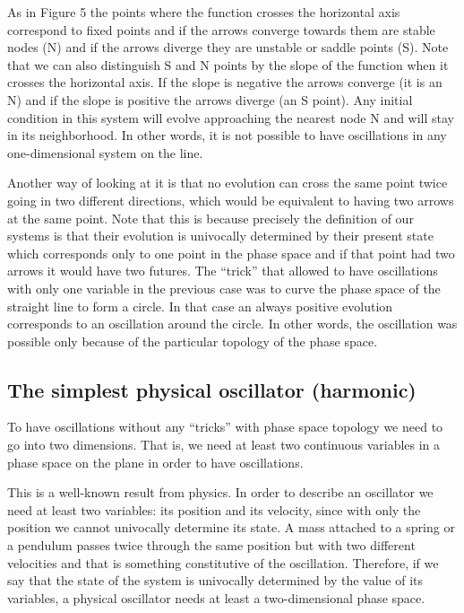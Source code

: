 \documentclass{article}
\begin{document}
As in Figure 5 the points where the function crosses the horizontal axis correspond to fixed points and if the arrows converge towards them are stable nodes (N) and if the arrows diverge they are unstable or saddle points (S). 
Note that we can also distinguish S and N points by the slope of the function when it crosses the horizontal axis. 
If the slope is negative the arrows converge (it is an N) and if the slope is positive the arrows diverge (an S point). 
Any initial condition in this system will evolve approaching the nearest node N and will stay in its neighborhood. In other words, it is not possible to have oscillations in any one-dimensional system on the line. 

Another way of looking at it is that no evolution can cross the same point twice going in two different directions, which would be equivalent to having two arrows at the same point. 
Note that this is because precisely the definition of our systems is that their evolution is univocally determined by their present state which corresponds only to one point in the phase space and if that point had two arrows it would have two futures. 
The “trick” that allowed to have oscillations with only one variable in the previous case was to curve the phase space of the straight line to form a circle. 
In that case an always positive evolution corresponds to an oscillation around the circle. 
In other words, the oscillation was possible only because of the particular topology of the phase space. 




\subsection{The simplest physical oscillator (harmonic)}

To have oscillations without any “tricks” with phase space topology we need to go into two dimensions. 
That is, we need at least two continuous variables in a phase space on the plane in order to have oscillations. 

This is a well-known result from physics. 
In order to describe an oscillator we need at least two variables: its position and its velocity, since with only the position we cannot univocally determine its state. 
A mass attached to a spring or a pendulum passes twice through the same position but with two different velocities and that is something constitutive of the oscillation. 
Therefore, if we say that the state of the system is univocally determined by the value of its variables, a physical oscillator needs at least a two-dimensional phase space. 
\end{document}
